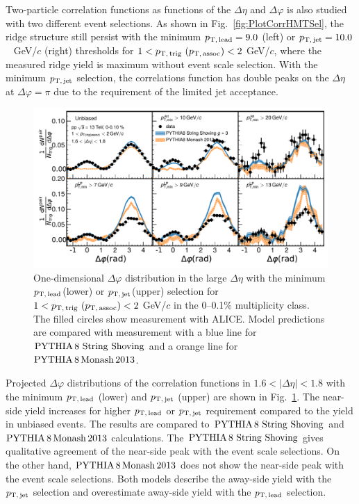 Two-particle correlation functions as functions of the $\Delta \eta$ and $\Delta \varphi$ is also studied with two different event selections. As shown in Fig.~\ref{fig:PlotCorrHMTSel}, the ridge structure still persist with the minimum $p_\mathrm{T,\,lead}=9.0$ (left) or $p_\mathrm{T,\,jet}=10.0$~ GeV/$c$ (right) thresholds for $1< p_\mathrm{T,\,trig}~\mathrm (p_\mathrm{T,\,assoc}) <2$ GeV/$c$, where the measured ridge yield is maximum without event scale selection.
With the minimum $p_\mathrm{T,\,jet}$ selection, the correlations function has double peaks on the $\Delta\eta$ at $\Delta\varphi = \pi$ due to the requirement of the limited jet acceptance.

\begin{figure}[h!]
	\centering
	\includegraphics[width=0.99\linewidth]{./figures/Fig5_PlotDeltaPhiESE.pdf}
	\caption{ One-dimensional $\Delta\varphi$ distribution in the large $\Delta\eta$ with the minimum $p_\mathrm{T,\,lead}$(lower) or $p_\mathrm{T,\,jet}$(upper) selection for $1< p_\mathrm{T,\,trig}~\mathrm (p_\mathrm{T,\,assoc}) <2$ GeV/$c$ in the 0--0.1\% multiplicity class. The filled circles show measurement with ALICE. Model predictions are compared with measurement with a blue line for $\mathrm{PYTHIA}\,8~\mathrm{String}~\mathrm{Shoving}$  and a orange line for $\mathrm{PYTHIA}\,8\,\mathrm{Monash}\,2013$.}
	\label{fig:PlotDeltaPhiESE}
\end{figure}

Projected $\Delta\varphi$ distributions of the correlation functions in $1.6<|\Delta\eta|<1.8$ with the minimum $p_\mathrm{T,\,lead}$ (lower) and $p_\mathrm{T,\,jet}$ (upper) are shown in Fig.~\ref{fig:PlotDeltaPhiESE}. The near-side yield increases for higher $p_\mathrm{T,\,lead}$ or $p_\mathrm{T,\,jet}$ requirement compared to the yield in unbiased events. The results are compared to
$\mathrm{PYTHIA}\,8~\mathrm{String}~\mathrm{Shoving}$ and $\mathrm{PYTHIA}\,8\,\mathrm{Monash}\,2013$ calculations. The $\mathrm{PYTHIA}\,8~\mathrm{String}~\mathrm{Shoving}$ gives qualitative agreement of the near-side peak with the event scale selections. On the other hand, $\mathrm{PYTHIA}\,8\,\mathrm{Monash}\,2013$ does not show the near-side peak with the event scale selections. Both models describe the away-side yield with the $p_\mathrm{T,\,jet}$ selection and overestimate away-side yield with the $p_\mathrm{T,\,lead}$ selection.


